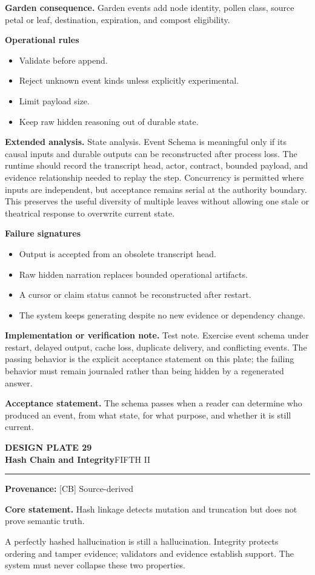 \documentclass[10pt,letterpaper,oneside]{article}
\newcommand{\prov}[1]{\textcolor{gardenBlue}{\sffamily\footnotesize\textbf{Provenance:} #1}}
\newcommand{\platetitle}[3]{%
  \begin{minipage}[t][0.54in][t]{\textwidth}
  {\sffamily\bfseries\color{gardenDeep}\fontsize{9}{10}\selectfont DESIGN PLATE #1}\\[-1pt]
  {\sffamily\bfseries\color{gardenInk}\fontsize{16.5}{18}\selectfont #2}\hfill{\sffamily\color{gardenGreen}\large #3}
  \end{minipage}\vspace{-2pt}\hrule\vspace{5pt}}
\begin{document}
\textbf{Garden consequence.} Garden events add node identity, pollen class, source petal or leaf, destination, expiration, and compost eligibility.

\textbf{Operational rules}
\begin{itemize}
\item Validate before append.
\item Reject unknown event kinds unless explicitly experimental.
\item Limit payload size.
\item Keep raw hidden reasoning out of durable state.
\end{itemize}
\textbf{Extended analysis.} State analysis. Event Schema is meaningful only if its causal inputs and durable outputs can be reconstructed after process loss. The runtime should record the transcript head, actor, contract, bounded payload, and evidence relationship needed to replay the step. Concurrency is permitted where inputs are independent, but acceptance remains serial at the authority boundary. This preserves the useful diversity of multiple leaves without allowing one stale or theatrical response to overwrite current state.

\textbf{Failure signatures}
\begin{itemize}
\item Output is accepted from an obsolete transcript head.
\item Raw hidden narration replaces bounded operational artifacts.
\item A cursor or claim status cannot be reconstructed after restart.
\item The system keeps generating despite no new evidence or dependency change.
\end{itemize}
\textbf{Implementation or verification note.} Test note. Exercise event schema under restart, delayed output, cache loss, duplicate delivery, and conflicting events. The passing behavior is the explicit acceptance statement on this plate; the failing behavior must remain journaled rather than being hidden by a regenerated answer.

\begin{acceptbox}
\textbf{Acceptance statement.} The schema passes when a reader can determine who produced an event, from what state, for what purpose, and whether it is still current.
\end{acceptbox}
\newpage
\platetitle{29}{Hash Chain and Integrity}{FIFTH II}
\prov{[CB] Source-derived}
\fontsize{8.85}{10.45}\selectfont
\begin{corebox}
\textbf{Core statement.} Hash linkage detects mutation and truncation but does not prove semantic truth.
\end{corebox}
A perfectly hashed hallucination is still a hallucination. Integrity protects ordering and tamper evidence; validators and evidence establish support. The system must never collapse these two properties.
\end{document}
